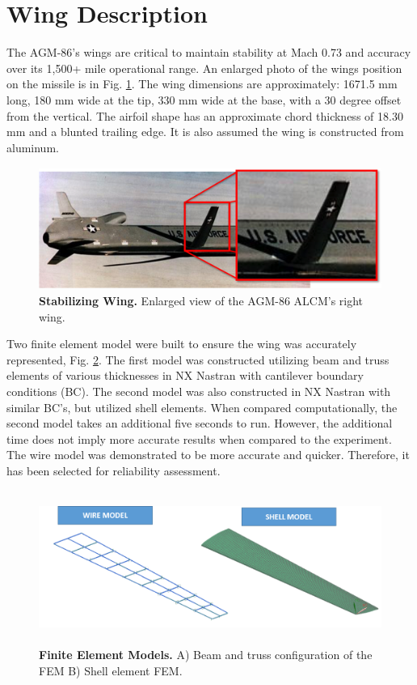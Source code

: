 \documentclass[paper=a4, fontsize=12pt]{scrartcl} %
\begin{document}
\section*{Wing Description}
The AGM-86's wings are critical to maintain stability at Mach 0.73 and accuracy over its 1,500+ mile operational range. An enlarged photo of the wings position on the missile is in Fig. \ref{fig:cruiseMissile_wing}. The wing dimensions are approximately: 1671.5 mm long, 180 mm wide at the tip, 330 mm wide at the base, with a 30 degree offset from the vertical. The airfoil shape has an approximate chord thickness of 18.30 mm and a blunted trailing edge. It is also assumed the wing is constructed from aluminum.
%
\begin{figure}[H]
	\centering
	\includegraphics[height = 4.0cm]{Pictures/wing.png}
	\caption{\textbf{Stabilizing Wing.} Enlarged view of the AGM-86 ALCM's right wing.} 
	\label{fig:cruiseMissile_wing}
\end{figure}
%
Two finite element model were built to ensure the wing was accurately represented, Fig. \ref{fig:cruiseMissile_FEMS}. The first model was constructed utilizing beam and truss elements of various thicknesses in NX Nastran with cantilever boundary conditions (BC). The second model was also constructed in NX Nastran with similar BC's, but utilized shell elements. When compared computationally, the second model takes an additional five seconds to run. However, the additional time does not imply more accurate results when compared to the experiment. The wire model was demonstrated to be more accurate and quicker. Therefore, it has been selected for reliability assessment.
%
\begin{figure}[H]
	\centering
	\includegraphics[height = 5.0cm]{Pictures/FEMs.png}
	\caption{\textbf{Finite Element Models.} A) Beam and truss configuration of the FEM B) Shell element FEM.} 
	\label{fig:cruiseMissile_FEMS}
\end{figure}
\end{document}
